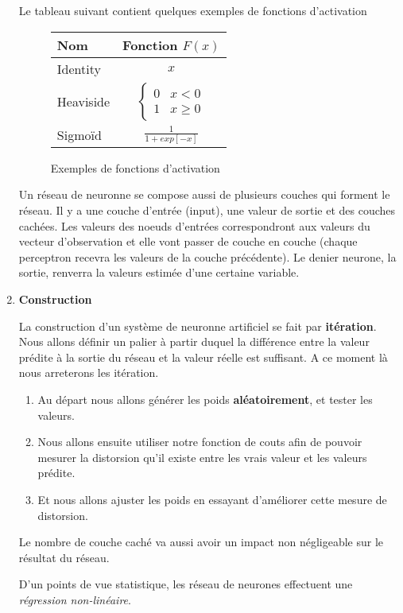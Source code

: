 \documentclass[a4paper, 11pt, onecolumn]{article}
\begin{document}
\begin{enumerate}
Le tableau suivant contient quelques exemples de fonctions d'activation
\begin{figure}[H]
\centering
\begin{tabular}{lc}
Nom & Fonction $F(x)$\\
\hline
Identity & $x$ \\
Heaviside & $\left\{\begin{array}{ll}0 & x < 0\\ 1 & x \geq 0\end{array}\right.$\\
Sigmoïd & $\frac{1}{1+exp[-x]}$\\
\hline
\end{tabular}
\caption{Exemples de fonctions d'activation}
\end{figure}

Un réseau de neuronne se compose aussi de plusieurs couches qui forment le réseau. Il y a une couche d'entrée (input), une valeur de sortie et des couches cachées. 
Les valeurs des noeuds d'entrées correspondront aux valeurs du vecteur d'observation et elle vont passer de couche en couche (chaque perceptron recevra les valeurs de la couche précédente). Le denier neurone, la sortie, renverra la valeurs estimée d'une certaine variable.

\item \textbf{Construction}

  La construction d'un système de neuronne artificiel se fait par \textbf{itération}. Nous allons définir un palier à partir duquel la différence entre la valeur prédite à la sortie du réseau et la valeur réelle est suffisant. A ce moment là nous arreterons les itération.

  \begin{enumerate}
    \item Au départ nous allons générer les poids \textbf{aléatoirement}, et tester les valeurs. 
    \item Nous allons ensuite utiliser notre fonction de couts afin de pouvoir mesurer la distorsion qu'il existe entre les vrais valeur et les valeurs prédite. 
    \item Et nous allons ajuster les poids en essayant d'améliorer cette mesure de distorsion.
  \end{enumerate}

Le nombre de couche caché va aussi avoir un impact non négligeable sur le résultat du réseau. 

D'un points de vue statistique, les réseau de neurones effectuent une \textit{régression non-linéaire}.


\end{enumerate}
\end{document}
